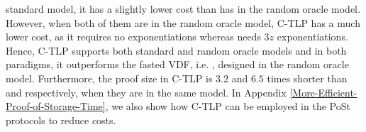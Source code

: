 standard model, it has a slightly lower cost than \cite{Wesolowski19} has in the random oracle model. However, when both of them are in the random oracle model, C-TLP   has a much lower cost, as it requires no exponentiations whereas  \cite{Wesolowski19} needs $3z$ exponentiations.  Hence,  C-TLP   supports both standard and random oracle models and in both paradigms, it outperforms the fasted VDF, i.e. \cite{Wesolowski19}, designed in the random oracle model. Furthermore, the  proof size in C-TLP  is $3.2$ and $6.5$ times shorter than \cite{BonehBBF18} and  \cite{Wesolowski19} respectively, when they are in the same model.  In Appendix \ref{More-Efficient-Proof-of-Storage-Time},  we also show how C-TLP can be employed in the PoSt protocols \cite{Storage-Time} to reduce costs. 








